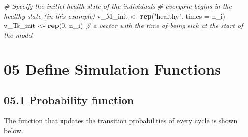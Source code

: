 \documentclass[
]{article}
\newenvironment{Shaded}{\begin{snugshade}}{\end{snugshade}}
\newcommand{\CommentTok}[1]{\textcolor[rgb]{0.56,0.35,0.01}{\textit{#1}}}
\newcommand{\DataTypeTok}[1]{\textcolor[rgb]{0.13,0.29,0.53}{#1}}
\newcommand{\DecValTok}[1]{\textcolor[rgb]{0.00,0.00,0.81}{#1}}
\newcommand{\KeywordTok}[1]{\textcolor[rgb]{0.13,0.29,0.53}{\textbf{#1}}}
\newcommand{\NormalTok}[1]{#1}
\newcommand{\StringTok}[1]{\textcolor[rgb]{0.31,0.60,0.02}{#1}}
\begin{document}
\begin{Shaded}
\begin{Highlighting}[]
\CommentTok{# Specify the initial health state of the individuals }
\CommentTok{# everyone begins in the healthy state (in this example)}
\NormalTok{v_M_init  <-}\StringTok{ }\KeywordTok{rep}\NormalTok{(}\StringTok{"healthy"}\NormalTok{, }\DataTypeTok{times =}\NormalTok{ n_i)   }
\NormalTok{v_Ts_init <-}\StringTok{ }\KeywordTok{rep}\NormalTok{(}\DecValTok{0}\NormalTok{, n_i)  }\CommentTok{# a vector with the time of being sick at the start of the model }
\end{Highlighting}
\end{Shaded}

\hypertarget{define-simulation-functions}{%
\section{05 Define Simulation
Functions}\label{define-simulation-functions}}

\hypertarget{probability-function}{%
\subsection{05.1 Probability function}\label{probability-function}}

The function that updates the transition probabilities of every cycle is
shown below.
\end{document}

